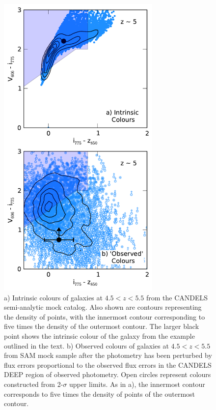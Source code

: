 \begin{figure}
\centering
\includegraphics[width=80mm]{plots/figA1.pdf}
\caption[a) Intrinsic colours of galaxies at $4.5 < z < 5.5$ from the CANDELS semi-analytic mock catalog. b) Observed colours of galaxies at $4.5 < z < 5.5$ from SAM mock sample after the photometry has been perturbed by flux errors proportional to the observed flux errors in the CANDELS DEEP region of observed photometry.]{a) Intrinsic colours of galaxies at $4.5 < z < 5.5$ from the CANDELS semi-analytic mock catalog. Also shown are contours representing the density of points, with the innermost contour corresponding to five times the density of the outermost contour. The larger black point shows the intrinsic colour of the galaxy from the example outlined in the text. b) Observed colours of galaxies at $4.5 < z < 5.5$ from SAM mock sample after the photometry has been perturbed by flux errors proportional to the observed flux errors in the CANDELS DEEP region of observed photometry. Open circles represent colours constructed from 2-$\sigma$ upper limits. As in a), the innermost contour corresponds to five times the density of points of the outermost contour.}
\label{smf-fig:mock_col}
\end{figure}

